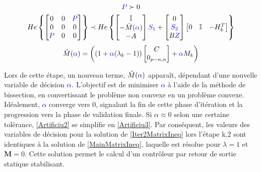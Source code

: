 \begin{equation}
\centering
    \begin{gathered}
        \textcolor{blue}{P} \succ 0 \\
        He\left\{ \begin{bmatrix}
            0 & 0 & \textcolor{blue}{P}\\
            0 & 0 & 0\\
            \textcolor{blue}{P} & 0 & 0
        \end{bmatrix}\right\}
    \prec
    He\left\{\begin{bmatrix}
           \mathbb{I}\\
                -\hat{M}(\textcolor{blue}{\alpha})\\
            -A
    \end{bmatrix}
    \textcolor{blue}{S_1} +
    \begin{bmatrix}
        0\\
        \textcolor{blue}{S_2}\\
        B\textcolor{blue}{Z}
    \end{bmatrix}
    \begin{bmatrix}
        0 & \mathbb{I} & -H_k^T
    \end{bmatrix}\right\}
    \end{gathered}
    \label{Iter2MatrixIneq}
\end{equation}
\begin{equation}
    \begin{gathered}
        \hat{M}(\textcolor{blue}{\alpha}) = \left((1+\textcolor{blue}{\alpha} (\lambda_k-1))
        \begin{bmatrix}
            C \\
            0_{p-n,n}
        \end{bmatrix}
        +
        \textcolor{blue}{\alpha} M_k\right)
    \end{gathered}
    \label{Artificiu2}
\end{equation}

Lors de cette étape, un nouveau terme, $\hat{M}(\textcolor{blue}{\alpha})$ apparaît, dépendant d'une nouvelle variable de décision $\textcolor{blue}{\alpha}$. L'objectif est de minimiser \textcolor{blue}{$\alpha$} à l'aide de la méthode de bissection, en convertissant le problème non convexe en un problème convexe. Idéalement, \textcolor{blue}{$\alpha$} converge vers 0, signalant la fin de cette phase d'itération et la progression vers la phase de validation finale. Si $\alpha \approx 0$ selon une certaine tolérance, \eqref{Artificiu2} se simplifie en \eqref{Artificiu3}. Par conséquent, les valeurs des variables de décision pour la solution de \eqref{Iter2MatrixIneq} lors l'étape k,2 sont identiques à la solution de \eqref{MainMatrixIneq}, laquelle est résolue pour $\lambda = 1$ et $\boldsymbol{M} =0$. Cette solution permet le calcul d'un contrôleur par retour de sortie statique stabilisant.


